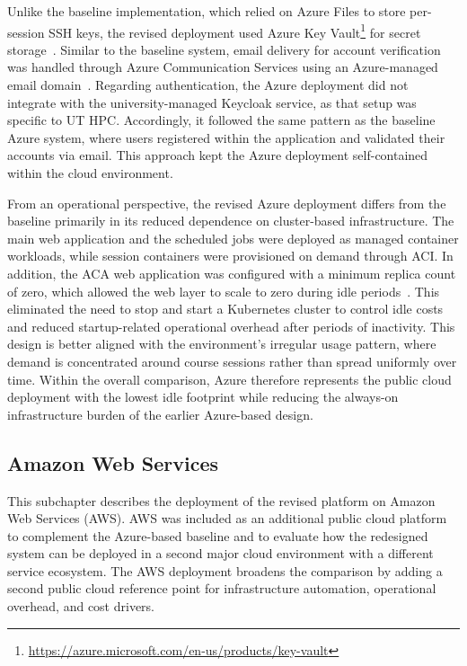 Unlike the baseline implementation, which relied on Azure Files to store per-session SSH keys, the revised deployment used Azure Key Vault\footnote{\url{https://azure.microsoft.com/en-us/products/key-vault}} for secret storage~\cite{eistre_2024}.
Similar to the baseline system, email delivery for account verification was handled through Azure Communication Services using an Azure-managed email domain~\cite{microsoft_azure_communication_services_email_2025,eistre_2024}.
Regarding authentication, the Azure deployment did not integrate with the university-managed Keycloak service, as that setup was specific to UT HPC\@.
Accordingly, it followed the same pattern as the baseline Azure system, where users registered within the application and validated their accounts via email.
This approach kept the Azure deployment self-contained within the cloud environment.

From an operational perspective, the revised Azure deployment differs from the baseline primarily in its reduced dependence on cluster-based infrastructure.
The main web application and the scheduled jobs were deployed as managed container workloads, while session containers were provisioned on demand through ACI\@.
In addition, the ACA web application was configured with a minimum replica count of zero, which allowed the web layer to scale to zero during idle periods~\cite{microsoft_azure_container_apps_scaling_2025}.
This eliminated the need to stop and start a Kubernetes cluster to control idle costs and reduced startup-related operational overhead after periods of inactivity.
This design is better aligned with the environment's irregular usage pattern, where demand is concentrated around course sessions rather than spread uniformly over time.
Within the overall comparison, Azure therefore represents the public cloud deployment with the lowest idle footprint while reducing the always-on infrastructure burden of the earlier Azure-based design.

\subsection{Amazon Web Services} \label{subsec:amazon-web-services}
This subchapter describes the deployment of the revised platform on Amazon Web Services (AWS).
AWS was included as an additional public cloud platform to complement the Azure-based baseline and to evaluate how the redesigned system can be deployed in a second major cloud environment with a different service ecosystem.
The AWS deployment broadens the comparison by adding a second public cloud reference point for infrastructure automation, operational overhead, and cost drivers.

